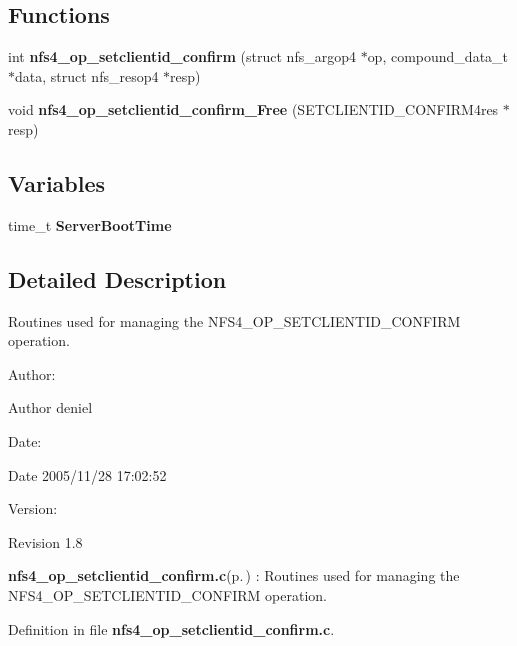 \subsection*{Functions}
\begin{CompactItemize}
\item 
int {\bf nfs4\_\-op\_\-setclientid\_\-confirm} (struct nfs\_\-argop4 $\ast$op, compound\_\-data\_\-t $\ast$data, struct nfs\_\-resop4 $\ast$resp)
\item 
void {\bf nfs4\_\-op\_\-setclientid\_\-confirm\_\-Free} (SETCLIENTID\_\-CONFIRM4res $\ast$resp)
\end{CompactItemize}
\subsection*{Variables}
\begin{CompactItemize}
\item 
time\_\-t {\bf Server\-Boot\-Time}
\end{CompactItemize}


\subsection{Detailed Description}
Routines used for managing the NFS4\_\-OP\_\-SETCLIENTID\_\-CONFIRM operation. 

\begin{Desc}
\item[Author:]\begin{Desc}
\item[Author]deniel \end{Desc}
\end{Desc}
\begin{Desc}
\item[Date:]\begin{Desc}
\item[Date]2005/11/28 17:02:52 \end{Desc}
\end{Desc}
\begin{Desc}
\item[Version:]\begin{Desc}
\item[Revision]1.8 \end{Desc}
\end{Desc}
{\bf nfs4\_\-op\_\-setclientid\_\-confirm.c}{\rm (p.\,\pageref{nfs4__op__setclientid__confirm_8c})} : Routines used for managing the NFS4\_\-OP\_\-SETCLIENTID\_\-CONFIRM operation.

Definition in file {\bf nfs4\_\-op\_\-setclientid\_\-confirm.c}.

